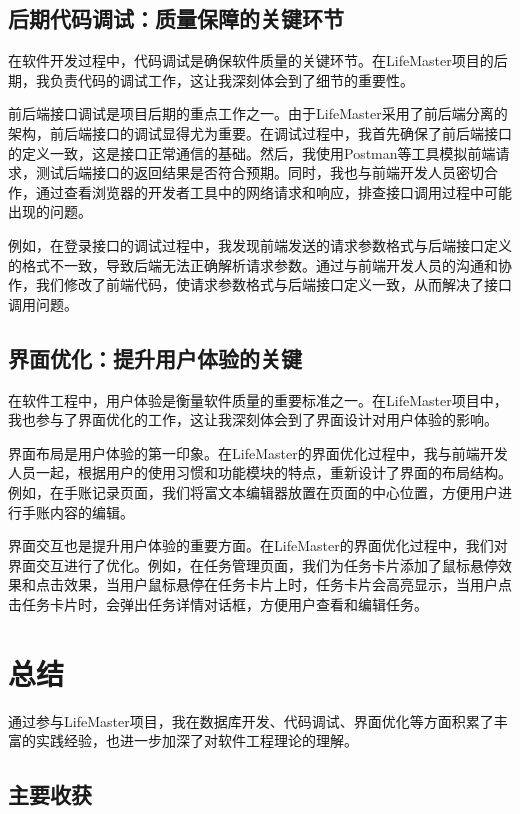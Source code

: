 \documentclass[a4paper]{article}
\begin{document}
\subsection{后期代码调试：质量保障的关键环节}

在软件开发过程中，代码调试是确保软件质量的关键环节。在LifeMaster项目的后期，我负责代码的调试工作，这让我深刻体会到了细节的重要性。

前后端接口调试是项目后期的重点工作之一。由于LifeMaster采用了前后端分离的架构，前后端接口的调试显得尤为重要。在调试过程中，我首先确保了前后端接口的定义一致，这是接口正常通信的基础。然后，我使用Postman等工具模拟前端请求，测试后端接口的返回结果是否符合预期。同时，我也与前端开发人员密切合作，通过查看浏览器的开发者工具中的网络请求和响应，排查接口调用过程中可能出现的问题。

例如，在登录接口的调试过程中，我发现前端发送的请求参数格式与后端接口定义的格式不一致，导致后端无法正确解析请求参数。通过与前端开发人员的沟通和协作，我们修改了前端代码，使请求参数格式与后端接口定义一致，从而解决了接口调用问题。

\subsection{界面优化：提升用户体验的关键}

在软件工程中，用户体验是衡量软件质量的重要标准之一。在LifeMaster项目中，我也参与了界面优化的工作，这让我深刻体会到了界面设计对用户体验的影响。

界面布局是用户体验的第一印象。在LifeMaster的界面优化过程中，我与前端开发人员一起，根据用户的使用习惯和功能模块的特点，重新设计了界面的布局结构。例如，在手账记录页面，我们将富文本编辑器放置在页面的中心位置，方便用户进行手账内容的编辑。

界面交互也是提升用户体验的重要方面。在LifeMaster的界面优化过程中，我们对界面交互进行了优化。例如，在任务管理页面，我们为任务卡片添加了鼠标悬停效果和点击效果，当用户鼠标悬停在任务卡片上时，任务卡片会高亮显示，当用户点击任务卡片时，会弹出任务详情对话框，方便用户查看和编辑任务。

\section{总结}

通过参与LifeMaster项目，我在数据库开发、代码调试、界面优化等方面积累了丰富的实践经验，也进一步加深了对软件工程理论的理解。

\subsection{主要收获}
\end{document}
